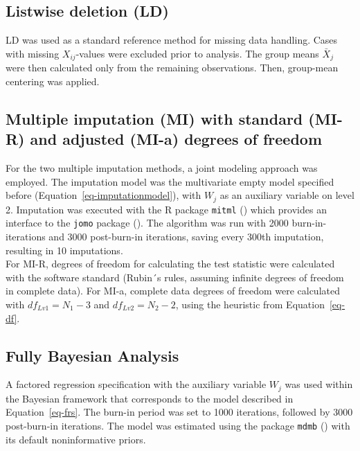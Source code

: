 \documentclass[
  letterpaper,
  11pt,
  english,
  singlespacing,
  headsepline,
  openany]{MastersDoctoralThesis}
\begin{document}
\subsection{Listwise deletion (LD)}\label{listwise-deletion-ld}

LD was used as a standard reference method for missing data handling.
Cases with missing \(X_{ij}\)-values were excluded prior to analysis.
The group means \(\bar{X}_{j}\) were then calculated only from the
remaining observations. Then, group-mean centering was applied.

\subsection{Multiple imputation (MI) with standard (MI-R) and adjusted
(MI-a) degrees of
freedom}\label{multiple-imputation-mi-with-standard-mi-r-and-adjusted-mi-a-degrees-of-freedom}

For the two multiple imputation methods, a joint modeling approach was
employed. The imputation model was the multivariate empty model
specified before (Equation~\ref{eq-imputationmodel}), with \(W_j\) as an
auxiliary variable on level 2. Imputation was executed with the R
package \texttt{mitml} () which
provides an interface to the \texttt{jomo} package
(). The algorithm was
run with 2000 burn-in-iterations and 3000 post-burn-in iterations,
saving every 300th imputation, resulting in 10 imputations.\\
For MI-R, degrees of freedom for calculating the test statistic were
calculated with the software standard (Rubin´s rules, assuming infinite
degrees of freedom in complete data). For MI-a, complete data degrees of
freedom were calculated with \(df_{Lv1} = N_1 - 3\) and
\(df_{Lv2} = N_2 - 2\), using the heuristic from Equation~\ref{eq-df}.

\subsection{Fully Bayesian Analysis}\label{fully-bayesian-analysis}

A factored regression specification with the auxiliary variable \(W_j\)
was used within the Bayesian framework that corresponds to the model
described in Equation~\ref{eq-frs}. The burn-in period was set to 1000
iterations, followed by 3000 post-burn-in iterations. The model was
estimated using the package \texttt{mdmb} () with its default noninformative priors.
\end{document}
